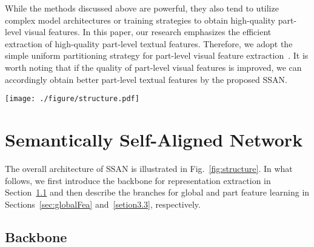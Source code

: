 \documentclass[journal]{IEEEtran}
\begin{document}
While the methods discussed above are powerful, they also tend to utilize complex model architectures or training strategies to obtain high-quality part-level visual features.
In this paper, our research emphasizes the efficient extraction of high-quality part-level textual features.
Therefore, we adopt the simple uniform partitioning strategy for part-level visual feature extraction~\cite{sun2018beyond}.
It is worth noting that if the quality of part-level visual features is improved, we can accordingly obtain better part-level textual features by the proposed SSAN.


\begin{figure*}[!t] \centering
  \texttt{[image: ./figure/structure.pdf]}
  \caption{The SSAN model architecture. Based on the ResNet-50 and Bi-LSTM backbones, SSAN extracts global and part features respectively from both modalities. For simplicity, only the global branch and the $k$-th part branch are shown. $k$ is equal to 3 in this figure. The other $K$-1 part branches have the same structure as the $k$-th one. For the global branch, we adopt a weight sharing strategy on the last $1\times1$ Conv layer, which aligns the features from the two modalities more tightly in terms of semantics. Each part branch includes one Part-specific Feature Learning (PFL) module and one Part Relation Learning (PRL) module. The former module enables SSAN to automatically extract part-level features from both modalities, without using any external tools or cross-modal operations; the latter enables SSAN to capture the relationships between body parts so as to establish better semantic correspondences with noun phrases.}
\label{fig:structure}
\end{figure*}


\section{Semantically Self-Aligned Network} \label{SSAN}
The overall architecture of SSAN is illustrated in Fig.~\ref{fig:structure}. In what follows, we first introduce the backbone for representation extraction in Section~\ref{setion3.1} and then describe the branches for global and part feature learning in Sections~\ref{sec:globalFea} and~\ref{setion3.3}, respectively.

\subsection{Backbone}\label{setion3.1}
\end{document}
